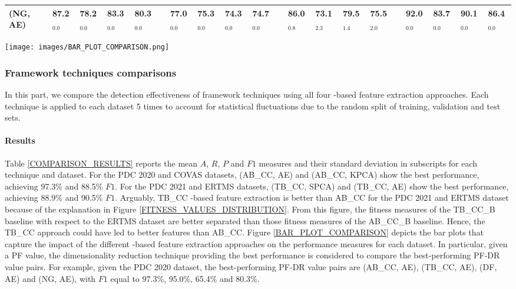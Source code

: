 \begin{table*}[!t]
{\begin{tabular}{llllllllllllllllllllll}
\multicolumn{2}{l}{(NG, AE)}           &  & 87.2$_{0.0}$          & 78.2$_{0.0}$          & 83.3$_{0.0}$          & 80.3$_{0.0}$          &  & 77.0$_{0.0}$          & 75.3$_{0.0}$          & 74.3$_{0.0}$          & 74.7$_{0.0}$          &  & 86.0$_{0.8}$          & 73.1$_{2.3}$          & 79.5$_{1.4}$          & 75.5$_{2.0}$          &  & 92.0$_{0.0}$          & 83.7$_{0.0}$          & 90.1$_{0.0}$          & 86.4$_{0.0}$          \\ \bottomrule
\end{tabular}%
}
\end{table*}
\begin{figure*}[t]
\centering
\texttt{[image: images/BAR\_PLOT\_COMPARISON.png]}
\caption{The mean $A$, $R$, $P$ and $F1$ per dataset of the best-performing dimensionality reduction technique for each -based feature extraction approach.}
\label{BAR_PLOT_COMPARISON}
\end{figure*}

\subsubsection{Framework techniques comparisons}
In this part, we compare the detection effectiveness of framework techniques using all four -based feature extraction approaches. Each technique is applied to each dataset 5 times to account for statistical fluctuations due to the random split of training, validation and test sets.

\paragraph{Results}
Table \ref{COMPARISON_RESULTS} reports the mean $A$, $R$, $P$ and $F1$ measures and their standard deviation in subscripts for each technique and dataset. For the PDC 2020 and COVAS datasets, (AB\_CC, AE) and (AB\_CC, KPCA) show the best performance, achieving 97.3\% and 88.5\% $F1$. For the PDC 2021 and ERTMS datasets, (TB\_CC, SPCA) and (TB\_CC, AE) show the best performance, achieving 88.9\% and 90.5\% $F1$. Arguably, TB\_CC -based feature extraction is better than AB\_CC for the PDC 2021 and ERTMS dataset because of the explanation in Figure \ref{FITNESS_VALUES_DISTRIBUTION}. From this figure, the fitness measures of the TB\_CC\_B baseline with respect to the ERTMS dataset are better separated than those fitness measures of the AB\_CC\_B baseline. Hence, the TB\_CC approach could have led to better features than AB\_CC. Figure \ref{BAR_PLOT_COMPARISON} depicts the bar plots that capture the impact of the different -based feature extraction approaches on the performance measures for each dataset. In particular, given a PF value, the dimensionality reduction technique providing the best performance is considered to compare the best-performing PF-DR value pairs. For example, given the PDC 2020 dataset, the best-performing PF-DR value pairs are (AB\_CC, AE), (TB\_CC, AE), (DF, AE) and (NG, AE), with $F1$ equal to 97.3\%, 95.0\%, 65.4\% and 80.3\%. 

